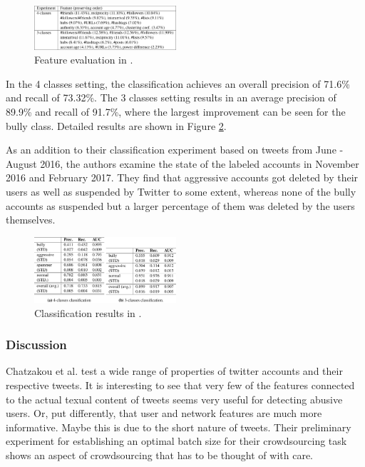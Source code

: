 \documentclass{proseminar}
\begin{document}
\begin{figure}
\centering
\includegraphics[width=0.47\textwidth]{img/twitter_features}
\caption{Feature evaluation in \cite{Twitter:2017}.}
\label{fig:twitter_features}
\end{figure}

In the 4 classes setting, the classification achieves an overall precision of 71.6\% and recall of 73.32\%. The 3 classes setting results in an average precision of 89.9\% and recall of 91.7\%, where the largest improvement can be seen for the bully class. Detailed results are shown in Figure \ref{fig:twitter_results}.

As an addition to their classification experiment based on tweets from June - August 2016, the authors examine the state of the labeled accounts in November 2016 and February 2017. They find that aggressive accounts got deleted by their users as well as suspended by Twitter to some extent, whereas none of the bully accounts as suspended but a larger percentage of them was deleted by the users themselves.

\begin{figure}
\centering
\includegraphics[width=0.47\textwidth]{img/twitter_results}
\caption{Classification results in \cite{Twitter:2017}.}
\label{fig:twitter_results}
\end{figure}

\subsubsection{Discussion} Chatzakou et al. test a wide range of properties of twitter accounts and their respective tweets. It is interesting to see that very few of the features connected to the actual texual content of tweets seems very useful for detecting abusive users. Or, put differently, that user and network features are much more informative. Maybe this is due to the short nature of tweets. Their preliminary experiment for establishing an optimal batch size for their crowdsourcing task shows an aspect of crowdsourcing that has to be thought of with care.
\end{document}
